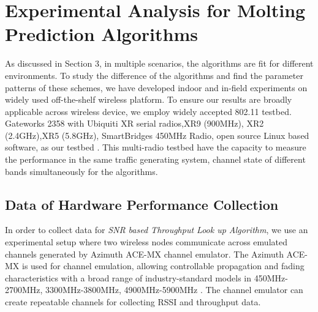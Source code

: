 \section{Experimental Analysis for Molting Prediction Algorithms}
\label{sec:experiment design}


As discussed in Section 3, in multiple scenarios, the algorithms are fit for different environments. To study the difference of the algorithms and find the parameter patterns of these schemes, we have developed indoor and in-field experiments 
on widely used off-the-shelf wireless platform.
To ensure our results are broadly applicable across wireless device, we employ widely accepted 802.11 testbed. Gateworks 2358 with Ubiquiti XR serial radios,XR9 (900MHz), XR2 (2.4GHz),XR5 (5.8GHz), SmartBridges 450MHz Radio, open source Linux based software, as our testbed \cite{Gateworks,Ubnt,Openwrt}. 
This multi-radio testbed have the capacity to measure the performance in the same traffic generating system, channel state of different bands simultaneously for the algorithms.


\subsection{Data of Hardware Performance Collection}
\label{subsec:ideal channel}
In order to collect data for \emph{SNR based Throughput Look up Algorithm}, we use an experimental setup where two wireless nodes communicate across emulated channels generated by Azimuth ACE-MX channel emulator. 
The Azimuth ACE-MX is used for channel emulation, allowing controllable propagation and fading characteristics with a broad range of industry-standard models in 450MHz-2700MHz, 3300MHz-3800MHz, 4900MHz-5900MHz \cite{AzimuthACE}. 
The channel emulator can create repeatable channels for collecting RSSI and throughput data.


